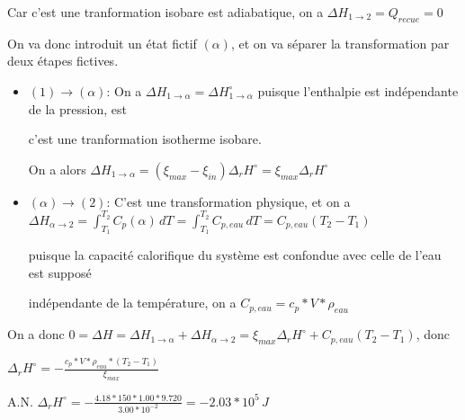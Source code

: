 \documentclass[a4paper,12pt]{book}
\begin{document}
\hspace*{\fill} 

Car c'est une tranformation isobare est adiabatique, on a $\Delta H_{1 \to 2}=Q_{recue}=0$

\hspace*{\fill} 

On va donc introduit un état fictif $(\alpha)$, et on va séparer la transformation par deux étapes fictives.

\begin{itemize}
    \item $(1) \to (\alpha)$: On a $\Delta H_{1 \to \alpha}=\Delta H_{1 \to \alpha}^\circ$ puisque l'enthalpie est 
          indépendante de la pression, est 
          
          \hspace*{\fill} 

          c'est une tranformation isotherme isobare. 
          
          \hspace*{\fill} 

          On a alors $\Delta H_{1 \to \alpha}=(\xi_{max}-\xi_{in})\Delta_rH^\circ=\xi_{max}\Delta_rH^\circ$
    \item $(\alpha) \to (2)$: C'est une transformation physique, et on a $\Delta H_{\alpha \to 2}=\int^{T_2}_{T_1}C_p(\alpha)\,dT=\int^{T_2}_{T_1}C_{p,eau}\,dT=C_{p,eau}(T_2-T_1)$
    
          \hspace*{\fill} 

          puisque la capacité calorifique du système est confondue avec celle de l’eau est supposé 
          
          \hspace*{\fill} 

          indépendante de la température, on a $C_{p,eau}=c_p*V*\rho_{eau}$

\end{itemize}
On a donc $0=\Delta H=\Delta H_{1 \to \alpha}+\Delta H_{\alpha \to 2}=\xi_{max}\Delta_rH^\circ+C_{p,eau}(T_2-T_1)$, donc 

\hspace*{\fill} 

$\boxed{\Delta_r H^\circ=-\frac{c_p*V*\rho_{eau}*(T_2-T_1)}{\xi_{max}}}$

\hspace*{\fill} 

A.N. $\boxed{\Delta_r H^\circ=-\frac{4.18*150*1.00*9.720}{3.00*10^{-2}}=-2.03*10^5\,J}$
\end{document}
